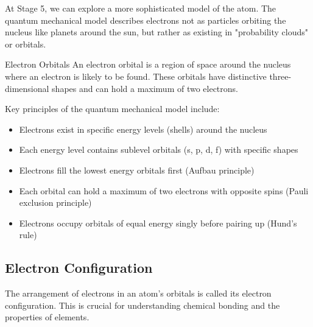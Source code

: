 At Stage 5, we can explore a more sophisticated model of the atom. The quantum mechanical model describes electrons not as particles orbiting the nucleus like planets around the sun, but rather as existing in "probability clouds" or orbitals.

\begin{keyconcept}{Electron Orbitals}
An electron orbital is a region of space around the nucleus where an electron is likely to be found. These orbitals have distinctive three-dimensional shapes and can hold a maximum of two electrons.
\end{keyconcept}

Key principles of the quantum mechanical model include:

\begin{itemize}
    \item Electrons exist in specific energy levels (shells) around the nucleus
    \item Each energy level contains sublevel orbitals (s, p, d, f) with specific shapes
    \item Electrons fill the lowest energy orbitals first (Aufbau principle)
    \item Each orbital can hold a maximum of two electrons with opposite spins (Pauli exclusion principle)
    \item Electrons occupy orbitals of equal energy singly before pairing up (Hund's rule)
\end{itemize}



\subsection{Electron Configuration}

The arrangement of electrons in an atom's orbitals is called its electron configuration. This is crucial for understanding chemical bonding and the properties of elements.

